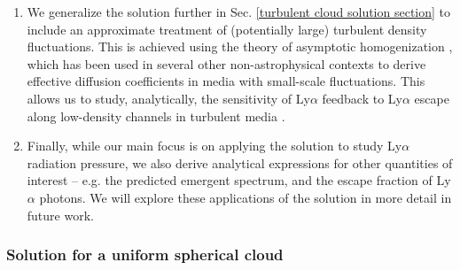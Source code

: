 \documentclass[fleqn,usenatbib]{mnras}
\newcommand\HI{\ion{H}{I}\xspace} %
\begin{document}
\begin{enumerate}
    \item We generalize the solution further in Sec. \ref{turbulent cloud solution section} to include an approximate treatment of (potentially large) turbulent density fluctuations. This is achieved using the theory of asymptotic homogenization \citep[e.g.][]{Zwillinger1992_Diffeqs, Holmes2013_Perturbation}, which has been used in several other non-astrophysical contexts to derive effective diffusion coefficients in media with small-scale fluctuations. This allows us to study, analytically, the sensitivity of Ly$\alpha$ feedback to Ly$\alpha$ escape along low-density channels in turbulent media \citep{Kimm2019, Kakiichi2021}. \\ 
    
    \item Finally, while our main focus is on applying the solution to study Ly$\alpha$ radiation pressure, we also derive analytical expressions for other quantities of interest -- e.g. the predicted emergent spectrum, and the escape fraction of Ly$\alpha$ photons. We will explore these applications of the solution in more detail in future work. 
\end{enumerate}

\subsubsection{Solution for a uniform spherical \HI cloud}
\label{uniform cloud solution}
\end{document}
